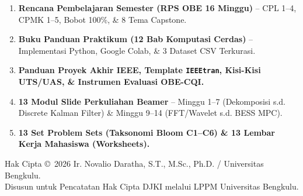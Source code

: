 \documentclass[11pt,a4paper]{article}
\begin{document}
\begin{enumerate}[label=\textbf{Bagian \Roman*.}, leftmargin=4.2em, itemsep=4pt]
    \item \textbf{Rencana Pembelajaran Semester (RPS OBE 16 Minggu)} -- CPL 1--4, CPMK 1--5, Bobot 100\%, \& 8 Tema Capstone.
    \item \textbf{Buku Panduan Praktikum (12 Bab Komputasi Cerdas)} -- Implementasi Python, Google Colab, \& 3 Dataset CSV Terkurasi.
    \item \textbf{Panduan Proyek Akhir IEEE, Template \texttt{IEEEtran}, Kisi-Kisi UTS/UAS, \& Instrumen Evaluasi OBE-CQI.}
    \item \textbf{13 Modul Slide Perkuliahan Beamer} -- Minggu 1--7 (Dekomposisi s.d. Discrete Kalman Filter) \& Minggu 9--14 (FFT/Wavelet s.d. BESS MPC).
    \item \textbf{13 Set Problem Sets (Taksonomi Bloom C1--C6) \& 13 Lembar Kerja Mahasiswa (Worksheets).}
\end{enumerate}

\vfill
\begin{center}
    {\small\color{gray}Hak Cipta \copyright\ 2026 Ir. Novalio Daratha, S.T., M.Sc., Ph.D. / Universitas Bengkulu.\\
    Disusun untuk Pencatatan Hak Cipta DJKI melalui LPPM Universitas Bengkulu.}
\end{center}
\end{document}
